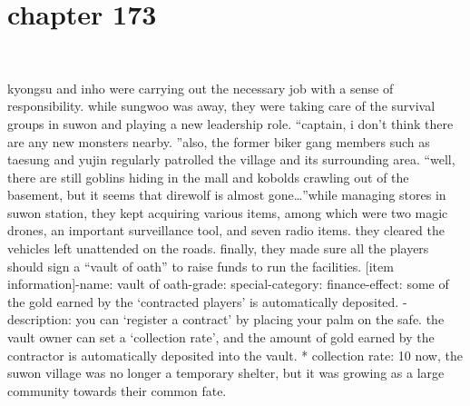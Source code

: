 \section{chapter 173}

                             




kyongsu and inho were carrying out the necessary job with a sense of responsibility.
 while sungwoo was away, they were taking care of the survival groups in suwon and playing a new leadership role.
“captain, i don’t think there are any new monsters nearby.
”also, the former biker gang members such as taesung and yujin regularly patrolled the village and its surrounding area.
“well, there are still goblins hiding in the mall and kobolds crawling out of the basement, but it seems that direwolf is almost gone…”while managing stores in suwon station, they kept acquiring various items, among which were two magic drones, an important surveillance tool, and seven radio items.
they cleared the vehicles left unattended on the roads.
finally, they made sure all the players should sign a “vault of oath” to raise funds to run the facilities.
[item information]-name: vault of oath-grade: special-category: finance-effect: some of the gold earned by the ‘contracted players’ is automatically deposited.
-description: you can ‘register a contract’ by placing your palm on the safe.
 the vault owner can set a ‘collection rate’, and the amount of gold earned by the contractor is automatically deposited into the vault.
* collection rate: 10%
now, the suwon village was no longer a temporary shelter, but it was growing as a large community towards their common fate.

